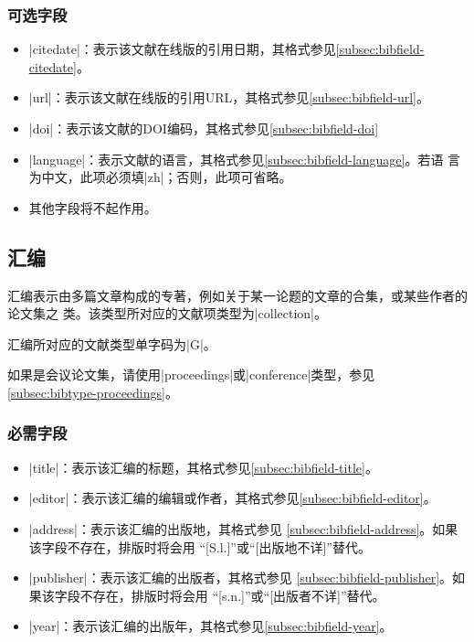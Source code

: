 \subsubsection{可选字段}

\begin{itemize}
\item |citedate|：表示该文献在线版的引用日期，其格式参见\ref{subsec:bibfield-citedate}。
\item |url|：表示该文献在线版的引用URL，其格式参见\ref{subsec:bibfield-url}。
\item |doi|：表示该文献的DOI编码，其格式参见\ref{subsec:bibfield-doi}
\item |language|：表示文献的语言，其格式参见\ref{subsec:bibfield-language}。若语
  言为中文，此项必须填|zh|；否则，此项可省略。
\item 其他字段将不起作用。
\end{itemize}

\subsection{汇编}\label{subsec:bibtype-collection}

汇编表示由多篇文章构成的专著，例如关于某一论题的文章的合集，或某些作者的论文集之
类。该类型所对应的{\BibTeX}文献项类型为|collection|。

汇编所对应的文献类型\cite{gbt3469-1983}单字码为|G|。

\begin{note}
如果是会议论文集，请使用|proceedings|或|conference|类型，参见
\ref{subsec:bibtype-proceedings}。
\end{note}

\subsubsection{必需字段}

\begin{itemize}
\item |title|：表示该汇编的标题，其格式参见\ref{subsec:bibfield-title}。
\item |editor|：表示该汇编的编辑或作者，其格式参见\ref{subsec:bibfield-editor}。
\item |address|：表示该汇编的出版地，其格式参见
  \ref{subsec:bibfield-address}。如果该字段不存在，{\BibTeX}排版时将会用
  ``[S.l.]''或``[出版地不详]''替代。
\item |publisher|：表示该汇编的出版者，其格式参见
  \ref{subsec:bibfield-publisher}。如果该字段不存在，{\BibTeX}排版时将会用
  ``[s.n.]''或``[出版者不详]''替代。
\item |year|：表示该汇编的出版年，其格式参见\ref{subsec:bibfield-year}。
\end{itemize}

